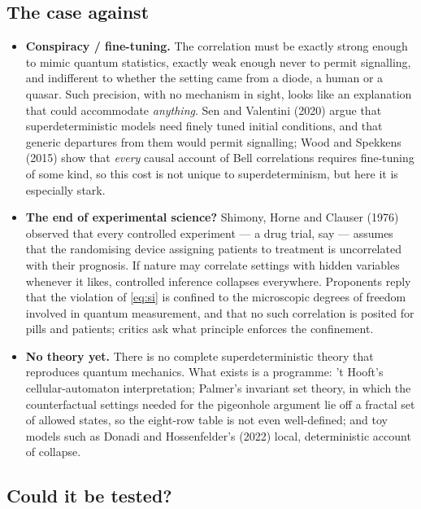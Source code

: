 \documentclass[11pt,a4paper]{article}
\theoremstyle{remark}
\begin{document}
\subsection{The case against}

\begin{itemize}
 \item \textbf{Conspiracy / fine-tuning.} The correlation must be exactly strong
       enough to mimic quantum statistics, exactly weak enough never to permit
       signalling, and indifferent to whether the setting came from a diode, a
       human or a quasar. Such precision, with no mechanism in sight, looks like
       an explanation that could accommodate \emph{anything}. Sen and Valentini
       (2020) argue that superdeterministic models need finely tuned initial
       conditions, and that generic departures from them would permit signalling;
       Wood and Spekkens (2015) show that \emph{every} causal account of Bell
       correlations requires fine-tuning of some kind, so this cost is not
       unique to superdeterminism, but here it is especially stark.
 \item \textbf{The end of experimental science?} Shimony, Horne and Clauser
       (1976) observed that every controlled experiment --- a drug trial, say ---
       assumes that the randomising device assigning patients to treatment is
       uncorrelated with their prognosis. If nature may correlate settings
       with hidden variables whenever it likes, controlled inference
       collapses everywhere. Proponents reply that the violation of
       \eqref{eq:si} is confined to the microscopic degrees of freedom involved
       in quantum measurement, and that no such correlation is posited for
       pills and patients; critics ask what principle enforces the confinement.
 \item \textbf{No theory yet.} There is no complete superdeterministic theory
       that reproduces quantum mechanics. What exists is a programme: 't
       Hooft's cellular-automaton interpretation; Palmer's invariant set theory,
       in which the counterfactual settings needed for the pigeonhole argument
       lie off a fractal set of allowed states, so the eight-row table is not
       even well-defined; and toy models such as Donadi and Hossenfelder's
       (2022) local, deterministic account of collapse.
\end{itemize}

\subsection{Could it be tested?}
\end{document}
